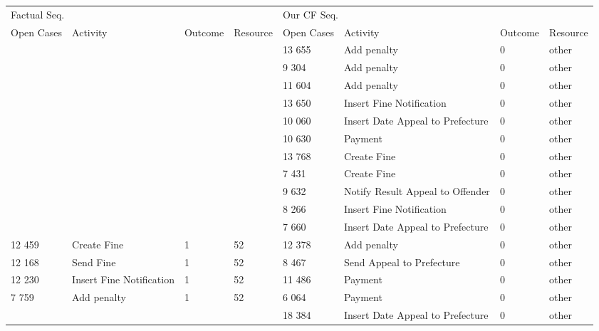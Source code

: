 \begin{tabular}{llllllll}
\toprule
\multicolumn{4}{l}{Factual Seq.} & \multicolumn{4}{l}{Our CF Seq.} \\
Open Cases & Activity & Outcome & Resource & Open Cases & Activity & Outcome & Resource \\
\midrule
 &  &  &  & 13 655 & Add penalty & 0 & other \\
 &  &  &  & 9 304 & Add penalty & 0 & other \\
 &  &  &  & 11 604 & Add penalty & 0 & other \\
 &  &  &  & 13 650 & Insert Fine Notification & 0 & other \\
 &  &  &  & 10 060 & Insert Date Appeal to Prefecture & 0 & other \\
 &  &  &  & 10 630 & Payment & 0 & other \\
 &  &  &  & 13 768 & Create Fine & 0 & other \\
 &  &  &  & 7 431 & Create Fine & 0 & other \\
 &  &  &  & 9 632 & Notify Result Appeal to Offender & 0 & other \\
 &  &  &  & 8 266 & Insert Fine Notification & 0 & other \\
 &  &  &  & 7 660 & Insert Date Appeal to Prefecture & 0 & other \\
12 459 & Create Fine & 1 & 52 & 12 378 & Add penalty & 0 & other \\
12 168 & Send Fine & 1 & 52 & 8 467 & Send Appeal to Prefecture & 0 & other \\
12 230 & Insert Fine Notification & 1 & 52 & 11 486 & Payment & 0 & other \\
7 759 & Add penalty & 1 & 52 & 6 064 & Payment & 0 & other \\
 &  &  &  & 18 384 & Insert Date Appeal to Prefecture & 0 & other \\
\bottomrule
\end{tabular}
